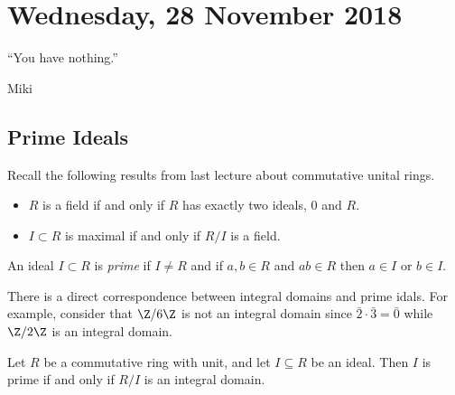 \section{Wednesday, 28 November 2018}

\epigraph{``You have nothing.''}{Miki}

\subsection{Prime Ideals}

Recall the following results from last lecture about commutative unital rings.
\begin{itemize}
\item $R$ is a field if and only if $R$ has exactly two ideals, $0$ and $R$.
\item $I \subset R$ is maximal if and only if $R/I$ is a field.
\end{itemize}

\begin{definition}
An ideal $I \subset R$ is \emph{prime} if $I \not= R$  and if $a,b \in R$ and $ab \in R$ then $a \in I$ or $b \in I$.
\end{definition}

\begin{example}
\end{example}

There is a direct correspondence between integral domains and prime idals. For example, consider that $\Z/6\Z$ is not an integral domain since $\bar{2}\cdot\bar{3} = \bar{0}$ while $\Z/2\Z$ is an integral domain.

\begin{proposition}
Let $R$ be a commutative ring with unit, and let $I \subseteq R$ be an ideal. Then $I$ is prime if and only if $R/I$ is an integral domain.
\end{proposition}

